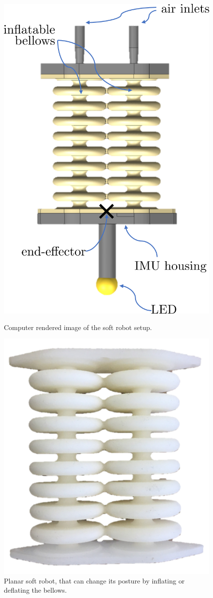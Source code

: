 \begin{figure}[H]
\begin{minipage}{.5\textwidth}
  \centering
  \includegraphics[width = 0.6\linewidth]{Figures/Chapter1/completesetup2.png}
  \caption{Computer rendered image of the soft robot setup.}
  \label{fig:test1}
\end{minipage}
\hspace{10pt}
\begin{minipage}{.5\textwidth}
  \centering
  \includegraphics[width =0.6\linewidth]{Figures/Chapter1/actuator.png}
  \vspace{60pt}
  \caption{Planar soft robot, that can change its posture by inflating or deflating the bellows.}
  \label{fig:test2}
\end{minipage}
\end{figure}



